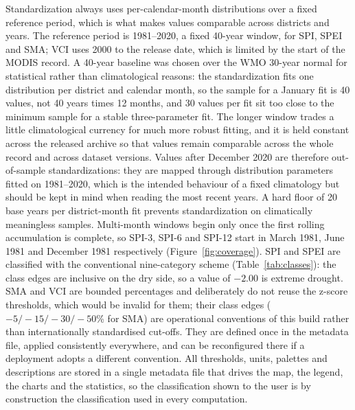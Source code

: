 \documentclass[10pt,a4paper]{article}
\begin{document}
Standardization always uses per-calendar-month distributions over a fixed reference period, which is what makes values comparable across districts and years. The reference period is 1981--2020, a fixed 40-year window, for SPI, SPEI and SMA; VCI uses 2000 to the release date, which is limited by the start of the MODIS record. A 40-year baseline was chosen over the WMO 30-year normal\citep{WMOLincoln2009} for statistical rather than climatological reasons: the standardization fits one distribution per district and calendar month, so the sample for a January fit is 40 values, not 40 years times 12 months, and 30 values per fit sit too close to the minimum sample for a stable three-parameter fit. The longer window trades a little climatological currency for much more robust fitting, and it is held constant across the released archive so that values remain comparable across the whole record and across dataset versions. Values after December 2020 are therefore out-of-sample standardizations: they are mapped through distribution parameters fitted on 1981--2020, which is the intended behaviour of a fixed climatology but should be kept in mind when reading the most recent years. A hard floor of 20 base years per district-month fit prevents standardization on climatically meaningless samples. Multi-month windows begin only once the first rolling accumulation is complete, so SPI-3, SPI-6 and SPI-12 start in March 1981, June 1981 and December 1981 respectively (Figure~\ref{fig:coverage}). SPI and SPEI are classified with the conventional nine-category scheme (Table~\ref{tab:classes}): the class edges are inclusive on the dry side, so a value of $-2.00$ is extreme drought. SMA and VCI are bounded percentages and deliberately do not reuse the z-score thresholds, which would be invalid for them; their class edges ($-5/-15/-30/-50$\% for SMA) are operational conventions of this build rather than internationally standardised cut-offs. They are defined once in the metadata file, applied consistently everywhere, and can be reconfigured there if a deployment adopts a different convention. All thresholds, units, palettes and descriptions are stored in a single metadata file that drives the map, the legend, the charts and the statistics, so the classification shown to the user is by construction the classification used in every computation.
\end{document}

